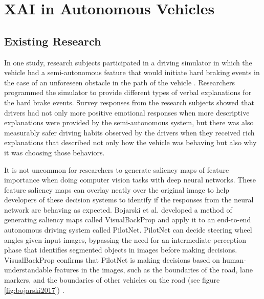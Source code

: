 \section{XAI in Autonomous Vehicles}\label{sec:Alignment}

\subsection{Existing Research}

In one study, research subjects participated in a driving simulator in which the vehicle had a semi-autonomous feature that would initiate hard braking events in the case of an unforeseen obstacle in the path of the vehicle \cite{Koo2015}.  Researchers programmed the simulator to provide different types of verbal explanations for the hard brake events.  Survey responses from the research subjects showed that drivers had not only more positive emotional responses when more descriptive explanations were provided by the semi-autonomous system, but there was also measurably safer driving habits observed by the drivers when they received rich explanations that described not only how the vehicle was behaving but also why it was choosing those behaviors.

It is not uncommon for researchers to generate saliency maps of feature importance when doing computer vision tasks with deep neural networks.  These feature saliency maps can overlay neatly over the original image to help developers of these decision systems to identify if the responses from the neural network are behaving as expected.  Bojarski et al. developed a method of generating saliency maps called VisualBackProp \cite{DBLP:journals/corr/BojarskiCCFJMZ16} and apply it to an end-to-end autonomous driving system called PilotNet.  PilotNet can decide steering wheel angles given input images, bypassing the need for an intermediate perception phase that identifies segmented objects in images before making decisions.  VisualBackProp confirms that PilotNet is making decisions based on human-understandable features in the images, such as the boundaries of the road, lane markers, and the boundaries of other vehicles on the road (see figure \ref{fig:bojarski2017}) \cite{Bojarski2017ExplainingHA}.

